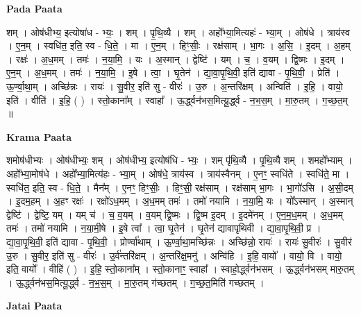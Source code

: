 \documentclass[17pt]{extarticle}
\begin{document}
\textbf{Pada Paata} \newline

शम् । ओष॑धीभ्य॒ इत्योषा॑ध - भ्यः॒ । शम् । पृ॒थि॒व्यै । शम् । अहो᳚भ्या॒मित्यहः॑ - भ्या॒म् । ओष॑धे । त्राय॑स्व । ए॒न॒म् । स्वधि॑त॒ इति॒ स्व - धि॒ते॒ । मा । ए॒न॒म् । हिꣳ॒॒सीः॒ । रक्ष॑साम् । भा॒गः । अ॒सि॒ । इ॒दम् । अ॒हम् । रक्षः॑ । अ॒ध॒मम् । तमः॑ । न॒या॒मि॒ । यः । अ॒स्मान् । द्वेष्टि॑ । यम् । च॒ । व॒यम् । द्वि॒ष्मः । इ॒दम् । ए॒न॒म् । अ॒ध॒मम् । तमः॑ । न॒या॒मि॒ । इ॒षे । त्वा॒ । घृ॒तेन॑ । द्या॒वा॒पृ॒थि॒वी॒ इति॑ द्यावा - पृ॒थि॒वी॒ । प्रेति॑ । ऊ॒र्ण्वा॒था॒म् । अच्छि॑न्नः । रायः॑ । सु॒वीर॒ इति॑ सु - वीरः॑ । उ॒रु । अ॒न्तरि॑क्षम् । अन्विति॑ । इ॒हि॒ । वायो॒ इति॑ । वीति॑ । इ॒हि॒ ( ) । स्तो॒काना᳚म् । स्वाहा᳚ । ऊ॒र्द्ध्वन॑भस॒मित्यू॒र्द्ध्व - न॒भ॒स॒म् । मा॒रु॒तम् । ग॒च्छ॒त॒म् ॥  \newline


\textbf{Krama Paata} \newline

शमोष॑धीभ्यः । ओष॑धीभ्यः॒ शम् । ओष॑धीभ्य॒ इत्योष॑धि - भ्यः॒ । शम् पृ॑थि॒व्यै । पृ॒थि॒व्यै शम् । शमहो᳚भ्याम् । अहो᳚भ्या॒मोष॑धे । अहो᳚भ्या॒मित्य॑हः - भ्या॒म् । ओष॑धे॒ त्राय॑स्व । त्राय॑स्वैनम् । ए॒नꣳ॒॒ स्वधि॑ते । स्वधि॑ते॒ मा । स्वधि॑त॒ इति॒ स्व - धि॒ते॒ । मैन᳚म् । ए॒नꣳ॒॒ हिꣳ॒॒सीः॒ । हिꣳ॒॒सी॒ रक्ष॑साम् । रक्ष॑साम् भा॒गः । भा॒गो॑ऽसि । अ॒सी॒दम् । इ॒दम॒हम् । अ॒हꣳ रक्षः॑ । रक्षो॑ऽध॒मम् । अ॒ध॒मम् तमः॑ । तमो॑ नयामि । न॒या॒मि॒ यः । यो᳚ऽस्मान् । अ॒स्मान् द्वेष्टि॑ । द्वेष्टि॒ यम् । यम् च॑ । च॒ व॒यम् । व॒यम् द्वि॒ष्मः । द्वि॒ष्म इ॒दम् । इ॒दमे॑नम् । ए॒न॒म॒ध॒मम् । अ॒ध॒मम् तमः॑ । तमो॑ नयामि । न॒या॒मी॒षे । इ॒षे त्वा᳚ । त्वा॒ घृ॒तेन॑ । घृ॒तेन॑ द्यावापृथिवी । द्या॒वा॒पृ॒थि॒वी॒ प्र । द्या॒वा॒पृ॒थि॒वी॒ इति॑ द्यावा - पृ॒थि॒वी॒ । प्रोर्ण्वा॑थाम् । ऊ॒र्ण्वा॒था॒मच्छि॑न्नः । अच्छि॑न्नो॒ रायः॑ । रायः॑ सु॒वीरः॑ । सु॒वीर॑ उ॒रु । सु॒वीर॒ इति॑ सु - वीरः॑ । उ॒र्व॑न्तरि॑क्षम् । अ॒न्तरि॑क्ष॒मनु॑ । अन्वि॑हि । इ॒हि॒ वायो᳚ । वायो॒ वि । वायो॒ इति॒ वायो᳚ । वीहि॑ ( )  । इ॒हि॒ स्तो॒काना᳚म् । स्तो॒कानाꣳ॒॒ स्वाहा᳚ । स्वाहो॒र्द्ध्वन॑भसम् । ऊ॒र्द्ध्वन॑भसम् मारु॒तम् । ऊ॒र्द्ध्वन॑भस॒मित्यू॒र्द्ध्व - न॒भ॒स॒म् । मा॒रु॒तम् ग॑च्छतम् । ग॒च्छ॒त॒मिति॑ गच्छतम् । \newline

\textbf{Jatai Paata} \newline
\end{document}
